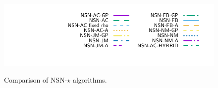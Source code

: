 \begin{figure}
   \\
{\includegraphics[height=\legendheight]{figure/NSN/1.0e-08/50/time/profile-Chain_legend.pdf}} 
  \caption{Comparison of {\sf NSN-$\star$} algorithms.}
  \label{fig:NSN}
\end{figure}




